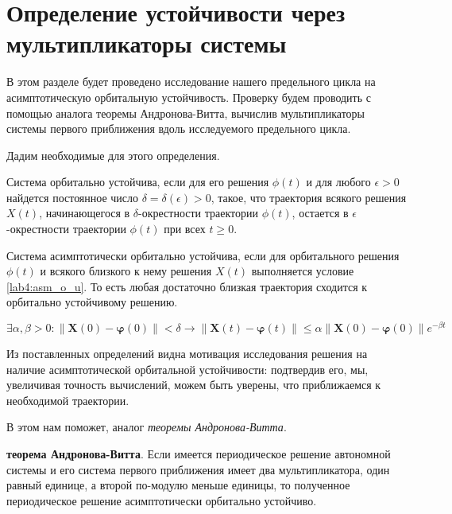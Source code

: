 \chapter{Определение устойчивости через мультипликаторы системы}\label{lab4}

В этом разделе будет проведено исследование нашего предельного цикла
на асимптотическую орбитальную устойчивость. Проверку будем проводить с помощью
аналога теоремы Андронова-Витта, вычислив мультипликаторы системы первого
приближения вдоль исследуемого предельного цикла.

Дадим необходимые для этого определения.

\begin{definition}
    Система орбитально устойчива, если для его решения $\phi(t)$ и  для любого
    $\epsilon > 0$ найдется постоянное число $\delta=\delta(\epsilon) > 0$, такое,
    что траектория всякого решения $X(t)$, начинающегося в $\delta$-окрестности
    траектории $\phi(t)$, остается в $\epsilon$-окрестности траектории $\phi(t)$
    при всех $t \geq 0$.
\end{definition}

\begin{definition}
    Система асимптотически орбитально устойчива, если для орбитального решения
    $\phi(t)$ и всякого близкого к нему решения $X(t)$ выполняется условие
    \ref{lab4:asm_o_u}. То есть любая достаточно близкая
    траектория сходится к орбитально устойчивому решению.
\end{definition}

\begin{equation}\label{lab4:asm_o_u}
    \exists \alpha, \beta > 0:
    \left\| {\mathbf{X}\left( 0 \right) -
            \boldsymbol{\varphi} \left( 0 \right)}
    \right\| < \delta
    \rightarrow
    \left\| {\mathbf{X}\left( t \right) -
            \boldsymbol{\varphi} \left( t \right)}
    \right\| \le \alpha
    \left\| {\mathbf{X}\left( 0 \right) -
            \boldsymbol{\varphi} \left( 0 \right)}
    \right\|{e^{ - \beta t}}
\end{equation}

Из поставленных определений видна мотивация исследования решения на наличие
асимптотической орбитальной устойчивости: подтвердив его, мы, увеличивая
точность вычислений, можем быть уверены, что приближаемся к необходимой
траектории.

В этом нам поможет, аналог \textit{теоремы Андронова-Витта}.

\begin{theorem}
    \textbf{теорема Андронова-Витта}. Если имеется
    периодическое решение автономной системы и его система первого приближения
    имеет два мультипликатора, один равный единице, а второй по-модулю меньше
    единицы, то полученное периодическое решение асимптотически орбитально устойчиво.
\end{theorem}

